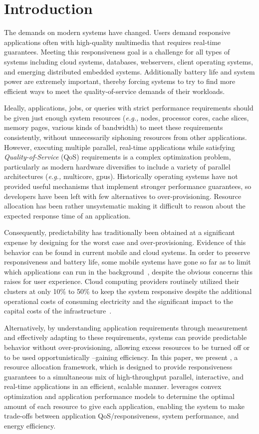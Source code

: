 \section{Introduction}


The demands on modern systems have changed.  Users demand responsive applications often with high-quality multimedia that requires real-time guarantees.  Meeting this responsiveness goal is a challenge for all types of systems including cloud systems, databases, webservers, client operating systems, and emerging distributed embedded systems. Additionally battery life and system power are extremely important, thereby forcing systems to try to find more efficient ways to meet the quality-of-service demands of their workloads.

Ideally, applications, jobs, or queries with strict performance requirements should be given just enough system resources (\emph{e.g.,} nodes, processor cores, cache slices, memory pages, various kinds of bandwidth) to meet these requirements consistently, without unnecessarily siphoning resources from other applications. However, executing multiple parallel, real-time applications while satisfying  \emph{Quality-of-Service} (QoS) requirements is a complex optimization problem, particularly as modern hardware diversifies to include a variety of parallel architectures (\emph{e.g.,} multicore, gpus).  Historically operating systems have not provided useful mechanisms that implement stronger performance guarantees, so developers have been left with few alternatives to over-provisioning.  Resource allocation has been rather unsystematic making it difficult to reason about the expected response time of an application.

Consequently, predictability has traditionally been obtained at a significant expense by designing for the worst case and over-provisioning.  Evidence of this behavior can be found in current mobile and cloud systems.  In order to preserve responsiveness and battery life,  some mobile systems have gone so far as to limit which applications can run in the background~\cite{iOsDev}, despite the obvious concerns this raises for user experience.  Cloud computing providers routinely utilized their clusters at only 10\% to 50\% to keep the system responsive despite the additional operational costs of consuming electricity and the significant impact to the capital costs of the infrastructure~\cite{Barroso2009,Hennessy2011}.

Alternatively, by understanding application requirements through measurement and effectively adapting to these requirements, systems can provide predictable behavior without over-provisioning, allowing excess resources to be turned off or to be used opportunistically --gaining efficiency.  In this paper, we present \pacora, a resource allocation framework, which is designed to provide responsiveness guarantees to a simultaneous mix of high-throughput parallel, interactive, and real-time applications in an efficient, scalable manner. \pacora leverages convex optimization and application performance models to determine the optimal amount of each resource to give each application, enabling the system to make trade-offs between application QoS/responsiveness, system performance, and energy efficiency. 

